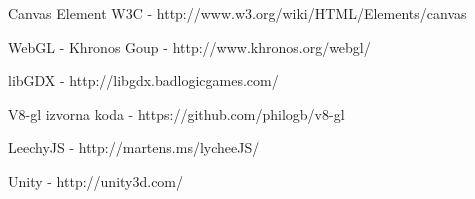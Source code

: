 \documentclass[a4paper,11pt]{article}
\begin{document}
\begin{thebibliography}{1}
 Canvas Element W3C - http://www.w3.org/wiki/HTML/Elements/canvas

 WebGL - Khronos Goup - http://www.khronos.org/webgl/

 libGDX - http://libgdx.badlogicgames.com/

 V8-gl izvorna koda - https://github.com/philogb/v8-gl

 LeechyJS - http://martens.ms/lycheeJS/

 Unity - http://unity3d.com/



\end{thebibliography}
\end{document}

